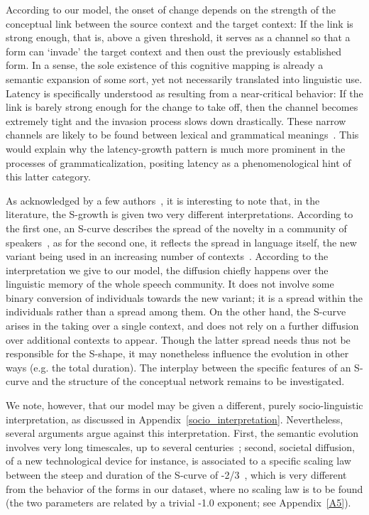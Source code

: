 \documentclass[12pt,twocolumn,amsmath,amssymb,aps,longbibliography]{revtex4-1}  %
\begin{document}
According to our model, the onset of change depends on the strength of the conceptual link between the source context and the target context: If the link is strong enough, that is, above a given threshold, it serves as a channel so that a form can `invade' the target context and then oust the previously established form. In a sense, the sole existence of this cognitive mapping is already a semantic expansion of some sort, yet not necessarily translated into linguistic use. Latency is specifically understood as resulting from a near-critical behavior: If the link is barely strong enough for the change to take off, then the channel becomes extremely tight and the invasion process slows down drastically. These narrow channels are likely to be found between lexical and grammatical meanings~\cite{heine2002role,diewald2006context}. This would explain why the latency-growth pattern is much more prominent in the processes of grammaticalization, positing latency as a phenomenological hint of this latter category.

As acknowledged by a few authors~\cite{ogura1996snowball,croft2000explaining}, it is interesting to note that, in the literature, the S-growth is given two very different interpretations. According to the first one, an S-curve describes the spread of the novelty in a community of speakers~\cite{osgood1954psycholinguistics,weinreich1968empirical,haspelmath2004directionality,ke2008language}, as for the second one, it reflects the spread in language itself, the new variant being used in an increasing number of contexts~\cite{mcmahon1994understanding,levin2006collective,aitchison2013language,burridge2016understanding}. According to the interpretation we give to our model, the diffusion chiefly happens over the linguistic memory of the whole speech community. It does not involve some binary conversion of individuals towards the new variant; it is a spread within the individuals rather than a spread among them. On the other hand, the S-curve arises in the taking over a single context, and does not rely on a further diffusion over additional contexts to appear. Though the latter spread needs thus not be responsible for the S-shape, it may nonetheless influence the evolution in other ways (e.g. the total duration). The interplay between the specific features of an S-curve and the structure of the conceptual network remains to be investigated. 

We note, however, that our model may be given a different, purely socio-linguistic interpretation, as discussed in Appendix~\ref{socio_interpretation}. Nevertheless, several arguments argue against this interpretation. First, the semantic evolution involves very long timescales, up to several centuries~\cite{levin2006collective}; second, societal diffusion, of a new technological device for instance, is associated to a specific scaling law between the steep and duration of the S-curve of -2/3~\cite{michard2005theory}, which is very different from the behavior of the forms in our dataset, where no scaling law is to be found (the two parameters are related by a trivial -1.0 exponent; see Appendix~\ref{A5}). 
\end{document}
